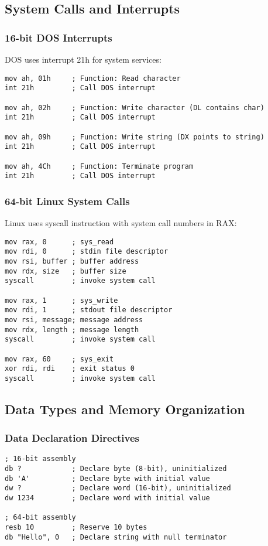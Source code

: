 \documentclass[12pt,a4paper]{article}
\begin{document}
\subsection{System Calls and Interrupts}

\subsubsection{16-bit DOS Interrupts}
DOS uses interrupt 21h for system services:
\begin{lstlisting}
mov ah, 01h     ; Function: Read character
int 21h         ; Call DOS interrupt

mov ah, 02h     ; Function: Write character (DL contains char)
int 21h         ; Call DOS interrupt

mov ah, 09h     ; Function: Write string (DX points to string)
int 21h         ; Call DOS interrupt

mov ah, 4Ch     ; Function: Terminate program
int 21h         ; Call DOS interrupt
\end{lstlisting}

\subsubsection{64-bit Linux System Calls}
Linux uses syscall instruction with system call numbers in RAX:
\begin{lstlisting}
mov rax, 0      ; sys_read
mov rdi, 0      ; stdin file descriptor
mov rsi, buffer ; buffer address
mov rdx, size   ; buffer size
syscall         ; invoke system call

mov rax, 1      ; sys_write
mov rdi, 1      ; stdout file descriptor
mov rsi, message; message address
mov rdx, length ; message length
syscall         ; invoke system call

mov rax, 60     ; sys_exit
xor rdi, rdi    ; exit status 0
syscall         ; invoke system call
\end{lstlisting}

\subsection{Data Types and Memory Organization}

\subsubsection{Data Declaration Directives}
\begin{lstlisting}
; 16-bit assembly
db ?            ; Declare byte (8-bit), uninitialized
db 'A'          ; Declare byte with initial value
dw ?            ; Declare word (16-bit), uninitialized
dw 1234         ; Declare word with initial value

; 64-bit assembly
resb 10         ; Reserve 10 bytes
db "Hello", 0   ; Declare string with null terminator
\end{lstlisting}
\end{document}
